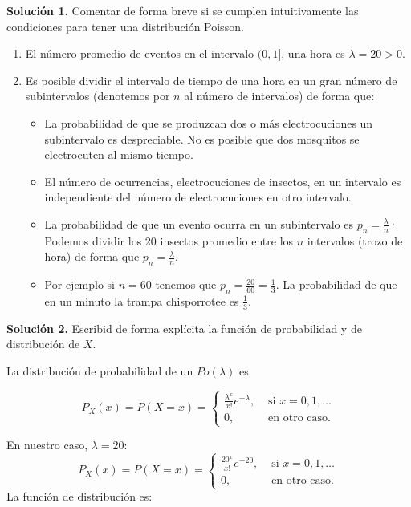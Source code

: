 \documentclass[
  letterpaper,
  DIV=11,
  numbers=noendperiod]{scrreprt}
\providecommand{\tightlist}{%
  \setlength{\itemsep}{0pt}\setlength{\parskip}{0pt}}\usepackage{longtable,booktabs,array}
\begin{document}
\textbf{Solución 1.} Comentar de forma breve si se cumplen
intuitivamente las condiciones para tener una distribución Poisson.

\begin{enumerate}
\def\labelenumi{\arabic{enumi}.}
\tightlist
\item
  El número promedio de eventos en el intervalo \((0,1]\), una hora es
  \(\lambda=20>0\).
\item
  Es posible dividir el intervalo de tiempo de una hora en un gran
  número de subintervalos (denotemos por \(n\) al número de intervalos)
  de forma que:

  \begin{itemize}
  \tightlist
  \item
    La probabilidad de que se produzcan dos o más electrocuciones un
    subintervalo es despreciable. No es posible que dos mosquitos se
    electrocuten al mismo tiempo.
  \item
    El número de ocurrencias, electrocuciones de insectos, en un
    intervalo es independiente del número de electrocuciones en otro
    intervalo.
  \item
    La probabilidad de que un evento ocurra en un subintervalo es
    \(p_n=\frac{\lambda}{n}\)· Podemos dividir los 20 insectos promedio
    entre los \(n\) intervalos (trozo de hora) de forma que
    \(p_n=\frac{\lambda}{n}\).
  \item
    Por ejemplo si \(n=60\) tenemos que
    \(p_n=\frac{20}{60}=\frac{1}{3}\). La probabilidad de que en un
    minuto la trampa chisporrotee es \(\frac{1}{3}\).
  \end{itemize}
\end{enumerate}

\textbf{Solución 2.} Escribid de forma explícita la función de
probabilidad y de distribución de \(X\).

La distribución de probabilidad de un \(Po(\lambda)\) es

\[
P_X(x)=P(X=x)=\left\{\begin{array}{ll}  \frac{\lambda^x}{x!}e^{-\lambda}, & \mbox{ si } x=0,1,\ldots\\ 0,  & \mbox{ en otro caso.}\end{array}\right.
\]

En nuestro caso, \(\lambda =20\): \[
P_X(x)=P(X=x)=\left\{\begin{array}{ll}\frac{20^x}{x!}e^{-20}, & \mbox{ si } x=0,1,\ldots\\ 0,  & \mbox{ en otro caso.}\end{array}\right.
\] La función de distribución es:
\end{document}

